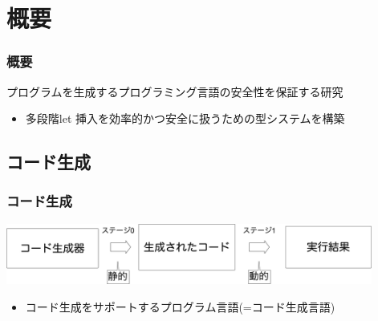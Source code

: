 
\section{概要}

\begin{frame}
  \frametitle{概要}
  プログラムを生成するプログラミング言語の安全性を保証する研究
  \begin{itemize}
  \item<2-> [⇒] \alert{多段階let 挿入}を効率的かつ安全に扱うための型システムを構築
  \end{itemize}
\end{frame}

\subsection{コード生成}
\begin{frame}
  \frametitle{コード生成}
  \medskip
  \flushleft
  \includegraphics[clip,height=2cm]{./img/prggen.png}

  \begin{itemize}
  \item コード生成をサポートするプログラム言語(=\alert{コード生成言語})
  \end{itemize}
\end{frame}


